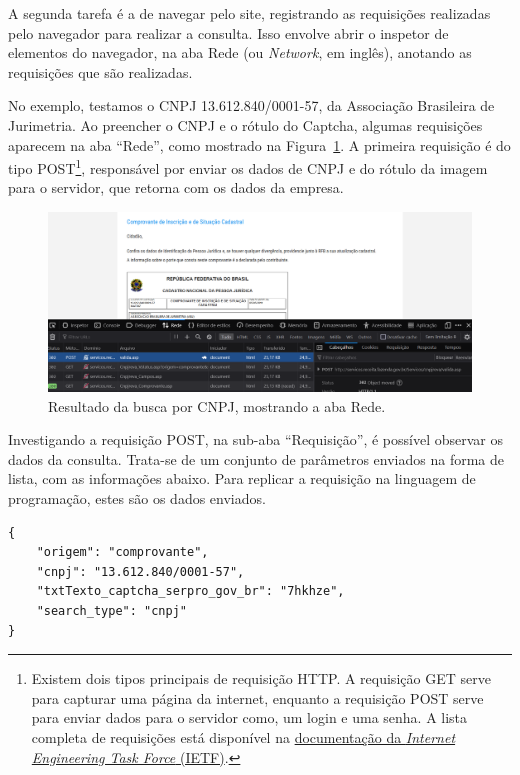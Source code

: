 \documentclass[12pt,twoside,brazilian]{book}
\begin{document}
A segunda tarefa é a de navegar pelo site, registrando as requisições
realizadas pelo navegador para realizar a consulta. Isso envolve abrir o
inspetor de elementos do navegador, na aba Rede (ou \emph{Network}, em
inglês), anotando as requisições que são realizadas.

No exemplo, testamos o CNPJ 13.612.840/0001-57, da Associação Brasileira
de Jurimetria. Ao preencher o CNPJ e o rótulo do Captcha, algumas
requisições aparecem na aba ``Rede'', como mostrado na
Figura~\ref{fig-raspagem-rfb-rede}. A primeira requisição é do tipo
POST\footnote{Existem dois tipos principais de requisição HTTP. A
  requisição GET serve para capturar uma página da internet, enquanto a
  requisição POST serve para enviar dados para o servidor como, um login
  e uma senha. A lista completa de requisições está disponível na
  \href{https://www.rfc-editor.org/rfc/rfc9110.html}{documentação da
  \emph{Internet Engineering Task Force} (IETF)}.}, responsável por
enviar os dados de CNPJ e do rótulo da imagem para o servidor, que
retorna com os dados da empresa.

\begin{figure}

{\centering \includegraphics{./assets/img/raspagem-rfb-rede.png}

}

\caption{\label{fig-raspagem-rfb-rede}Resultado da busca por CNPJ,
mostrando a aba Rede.}

\end{figure}

Investigando a requisição POST, na sub-aba ``Requisição'', é possível
observar os dados da consulta. Trata-se de um conjunto de parâmetros
enviados na forma de lista, com as informações abaixo. Para replicar a
requisição na linguagem de programação, estes são os dados enviados.

\begin{verbatim}
{
    "origem": "comprovante",
    "cnpj": "13.612.840/0001-57",
    "txtTexto_captcha_serpro_gov_br": "7hkhze",
    "search_type": "cnpj"
}
\end{verbatim}
\end{document}
